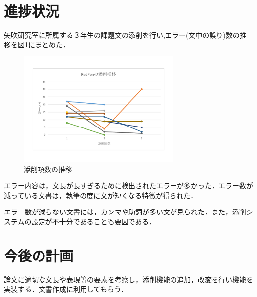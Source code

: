 \documentclass[uplatex,twocolumn,dvipdfmx]{jsarticle}
\begin{document}
\section{進捗状況}
矢吹研究室に所属する３年生の課題文の添削を行い,エラー(文中の誤り)数の推移を図\ref{conf}にまとめた．

\begin{figure}[h]
\centering
\includegraphics[width=8cm,clip]{images.pdf}
\caption{添削項数の推移}\label{conf}
\end{figure}

エラー内容は，文長が長すぎるために検出されたエラーが多かった．エラー数が減っている文書は，執筆の度に文が短くなる特徴が得られた．

エラー数が減らない文書には，カンマや助詞が多い文が見られた．また，添削システムの設定が不十分であることも要因である．



\section{今後の計画}
論文に適切な文長や表現等の要素を考察し，添削機能の追加，改変を行い機能を実装する．文書作成に利用してもらう．



\end{document}
